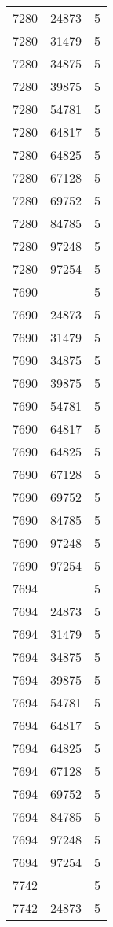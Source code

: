 {{\begin{tabular}{|c|c||c|}
7280&24873&5\\ 7280&31479&5\\ 7280&34875&5\\ 7280&39875&5\\ 7280&54781&5\\ 7280&64817&5\\ 7280&64825&5\\ 7280&67128&5\\ 7280&69752&5\\ 7280&84785&5\\ 7280&97248&5\\ 7280&97254&5\\ 7690& &5\\ 7690&24873&5\\ 7690&31479&5\\ 7690&34875&5\\ 7690&39875&5\\ 7690&54781&5\\ 7690&64817&5\\ 7690&64825&5\\ 7690&67128&5\\ 7690&69752&5\\ 7690&84785&5\\ 7690&97248&5\\ 7690&97254&5\\ 7694& &5\\ 7694&24873&5\\ 7694&31479&5\\ 7694&34875&5\\ 7694&39875&5\\ 7694&54781&5\\ 7694&64817&5\\ 7694&64825&5\\ 7694&67128&5\\ 7694&69752&5\\ 7694&84785&5\\ 7694&97248&5\\ 7694&97254&5\\ 7742& &5\\ 7742&24873&5\\ 
        \hline
        \end{tabular}
    }
}

